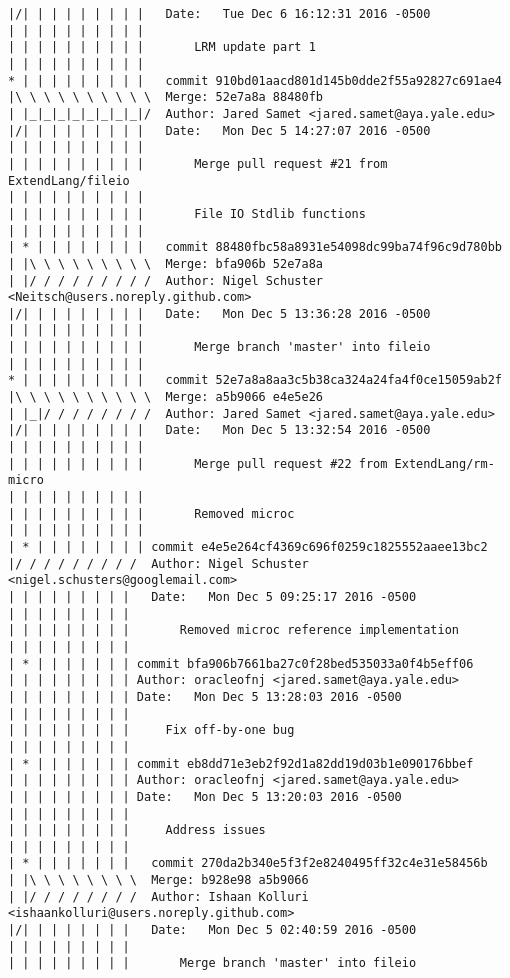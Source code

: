 \begin{lstlisting}
|/| | | | | | | | |   Date:   Tue Dec 6 16:12:31 2016 -0500
| | | | | | | | | |   
| | | | | | | | | |       LRM update part 1
| | | | | | | | | |             
* | | | | | | | | |   commit 910bd01aacd801d145b0dde2f55a92827c691ae4
|\ \ \ \ \ \ \ \ \ \  Merge: 52e7a8a 88480fb
| |_|_|_|_|_|_|_|_|/  Author: Jared Samet <jared.samet@aya.yale.edu>
|/| | | | | | | | |   Date:   Mon Dec 5 14:27:07 2016 -0500
| | | | | | | | | |   
| | | | | | | | | |       Merge pull request #21 from ExtendLang/fileio
| | | | | | | | | |       
| | | | | | | | | |       File IO Stdlib functions
| | | | | | | | | |             
| * | | | | | | | |   commit 88480fbc58a8931e54098dc99ba74f96c9d780bb
| |\ \ \ \ \ \ \ \ \  Merge: bfa906b 52e7a8a
| |/ / / / / / / / /  Author: Nigel Schuster <Neitsch@users.noreply.github.com>
|/| | | | | | | | |   Date:   Mon Dec 5 13:36:28 2016 -0500
| | | | | | | | | |   
| | | | | | | | | |       Merge branch 'master' into fileio
| | | | | | | | | |             
* | | | | | | | | |   commit 52e7a8a8aa3c5b38ca324a24fa4f0ce15059ab2f
|\ \ \ \ \ \ \ \ \ \  Merge: a5b9066 e4e5e26
| |_|/ / / / / / / /  Author: Jared Samet <jared.samet@aya.yale.edu>
|/| | | | | | | | |   Date:   Mon Dec 5 13:32:54 2016 -0500
| | | | | | | | | |   
| | | | | | | | | |       Merge pull request #22 from ExtendLang/rm-micro
| | | | | | | | | |       
| | | | | | | | | |       Removed microc
| | | | | | | | | |           
| * | | | | | | | | commit e4e5e264cf4369c696f0259c1825552aaee13bc2
|/ / / / / / / / /  Author: Nigel Schuster <nigel.schusters@googlemail.com>
| | | | | | | | |   Date:   Mon Dec 5 09:25:17 2016 -0500
| | | | | | | | |   
| | | | | | | | |       Removed microc reference implementation
| | | | | | | | |          
| * | | | | | | | commit bfa906b7661ba27c0f28bed535033a0f4b5eff06
| | | | | | | | | Author: oracleofnj <jared.samet@aya.yale.edu>
| | | | | | | | | Date:   Mon Dec 5 13:28:03 2016 -0500
| | | | | | | | | 
| | | | | | | | |     Fix off-by-one bug
| | | | | | | | |          
| * | | | | | | | commit eb8dd71e3eb2f92d1a82dd19d03b1e090176bbef
| | | | | | | | | Author: oracleofnj <jared.samet@aya.yale.edu>
| | | | | | | | | Date:   Mon Dec 5 13:20:03 2016 -0500
| | | | | | | | | 
| | | | | | | | |     Address issues
| | | | | | | | |            
| * | | | | | | |   commit 270da2b340e5f3f2e8240495ff32c4e31e58456b
| |\ \ \ \ \ \ \ \  Merge: b928e98 a5b9066
| |/ / / / / / / /  Author: Ishaan Kolluri <ishaankolluri@users.noreply.github.com>
|/| | | | | | | |   Date:   Mon Dec 5 02:40:59 2016 -0500
| | | | | | | | |   
| | | | | | | | |       Merge branch 'master' into fileio

\end{lstlisting}
